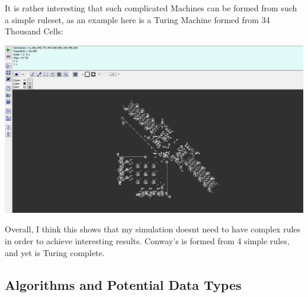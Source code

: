 \begin{flushleft}
                        \vspace{0.2cm}
                        It is rather interesting that such complicated Machines can be formed from such a simple ruleset, as an example 
                        here is a Turing Machine formed from 34 Thousand Cells: \\

                        \vspace{0.5cm}
                        \centerline{\includegraphics[width=14cm]{Images/InitialResearch/ConwaysTuringMachine.png}}
                        \vspace{0.2cm}

                        Overall, I think this shows that my simulation doesnt need to have complex rules in order to achieve 
                        interesting results. Conway's is formed from 4 simple rules, and yet is Turing complete.

                    \vspace{1cm}
                \subsection{Algorithms and Potential Data Types}
                    \large
                    \vspace{0.2cm}

\end{flushleft}
